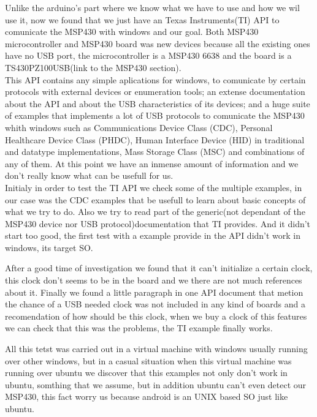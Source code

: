 		Unlike the arduino's part where we know what we have to use and how we wil use it, now we found that we just have an Texas Instruments(TI) API to comunicate the MSP430 with windows and our goal. Both MSP430 microcontroller and MSP430 board was new devices because all the existing ones have no USB port, the microcontroller is a MSP430 6638 and the board is a TS430PZ100USB(link to the MSP430 section).\\

		This API contains any simple aplications for windows, to comunicate by certain protocols with external devices or enumeration tools; an extense documentation about the API and about the USB characteristics of its devices; and a huge suite of examples that implements a lot of USB protocols to comunicate the MSP430 whith windows such as Communications Device Class (CDC), Personal Healthcare Device Class (PHDC), Human Interface Device (HID) in traditional and datatype implementations, Mass Storage Class (MSC) and combinations of any of them. At this point we have an inmense amount of information and we don't really know what can be usefull for us.\\
		
		Initialy in order to test the TI API we check some of the multiple examples, in our case was the CDC examples that be usefull to learn about basic concepts of what we try to do. Also we try to read part of the generic(not dependant of the MSP430 device nor USB protocol)documentation that TI provides. And it didn't start too good, the first test with a example provide in the API didn't work in windows, its target SO.

		After a good time of investigation we found that it can't initialize a certain clock, this clock don't seems to be in the board and we there are not much references about it. Finally we found a little paragraph in one API document that metion the chance of a USB needed clock was not included in any kind of boards and a recomendation of how should be this clock, when we buy a clock of this features we can check that this was the problems, the TI example finally works.

		All this tetst was carried out in a virtual machine with windows usually running over other windows, but in a casual situation when this virtual machine was running over ubuntu we discover that this examples not only don't work in ubuntu, somthing that we assume, but in addition ubuntu can't even detect our MSP430, this fact worry us because android is an UNIX based SO just like ubuntu. \\

